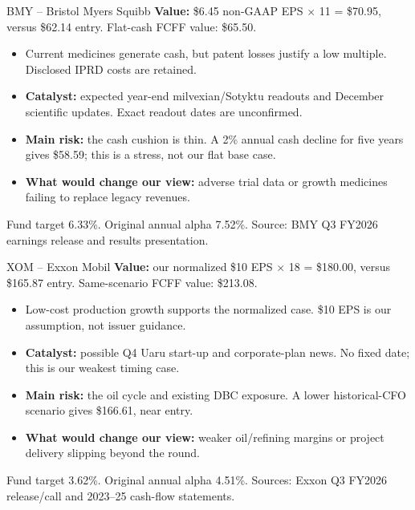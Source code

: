 \documentclass[aspectratio=169,11pt,t]{beamer}
\newcommand{\smnote}[1]{{\footnotesize\color{muted}#1}}
\newcommand{\tight}{\setlength{\itemsep}{0.45em}\setlength{\parskip}{0pt}}
\begin{document}
\begin{frame}{BMY -- Bristol Myers Squibb}
\vspace{.1em}
\textbf{Value:} \$6.45 non-GAAP EPS $\times$ 11 = \$70.95, versus \$62.14 entry. Flat-cash FCFF value: \$65.50.
\begin{itemize}\tight
\item Current medicines generate cash, but patent losses justify a low multiple. Disclosed IPRD costs are retained.
\item \textbf{Catalyst:} expected year-end milvexian/Sotyktu readouts and December scientific updates. Exact readout dates are unconfirmed.
\item \textbf{Main risk:} the cash cushion is thin. A 2\% annual cash decline for five years gives \$58.59; this is a stress, not our flat base case.
\item \textbf{What would change our view:} adverse trial data or growth medicines failing to replace legacy revenues.
\end{itemize}
\smnote{Fund target 6.33\%. Original annual alpha 7.52\%. Source: BMY Q3 FY2026 earnings release and results presentation.}
\end{frame}
\begin{frame}{XOM -- Exxon Mobil}
\vspace{.1em}
\textbf{Value:} our normalized \$10 EPS $\times$ 18 = \$180.00, versus \$165.87 entry. Same-scenario FCFF value: \$213.08.
\begin{itemize}\tight
\item Low-cost production growth supports the normalized case. \$10 EPS is our assumption, not issuer guidance.
\item \textbf{Catalyst:} possible Q4 Uaru start-up and corporate-plan news. No fixed date; this is our weakest timing case.
\item \textbf{Main risk:} the oil cycle and existing DBC exposure. A lower historical-CFO scenario gives \$166.61, near entry.
\item \textbf{What would change our view:} weaker oil/refining margins or project delivery slipping beyond the round.
\end{itemize}
\smnote{Fund target 3.62\%. Original annual alpha 4.51\%. Sources: Exxon Q3 FY2026 release/call and 2023--25 cash-flow statements.}
\end{frame}
\end{document}
